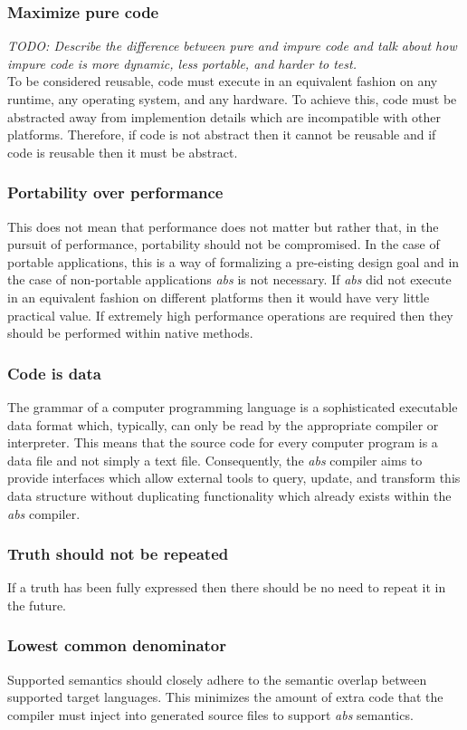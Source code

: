 \documentclass[hidelinks]{article}
\begin{document}
\subsubsection{Maximize pure code}
\textit{TODO: Describe the difference between pure and impure code and talk about how impure code is more dynamic, less portable, and harder to test.}\\
To be considered reusable, code must execute in an equivalent fashion on any runtime, any operating system, and any hardware. To achieve this, code must be abstracted away from implemention details which are incompatible with other platforms. Therefore, if code is not abstract then it cannot be reusable and if code is reusable then it must be abstract.
\subsubsection{Portability over performance}
This does not mean that performance does not matter but rather that, in the pursuit of performance, portability should not be compromised. In the case of portable applications, this is a way of formalizing a pre-eisting design goal and in the case of non-portable applications \textit{abs} is not necessary. If \textit{abs} did not execute in an equivalent fashion on different platforms then it would have very little practical value. If extremely high performance operations are required then they should be performed within native methods.
\subsubsection{Code is data}
The grammar of a computer programming language is a sophisticated executable data format which, typically, can only be read by the appropriate compiler or interpreter. This means that the source code for every computer program is a data file and not simply a text file. Consequently, the \textit{abs} compiler aims to provide interfaces which allow external tools to query, update, and transform this data structure without duplicating functionality which already exists within the \textit{abs} compiler.
\subsubsection{Truth should not be repeated}
If a truth has been fully expressed then there should be no need to repeat it in the future.
\subsubsection{Lowest common denominator}
Supported semantics should closely adhere to the semantic overlap between supported target languages. This minimizes the amount of extra code that the compiler must inject into generated source files to support \textit{abs} semantics.
\end{document}
